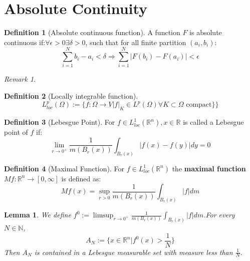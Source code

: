 \documentclass[a4paper,11pt,oneside,fleqn]{book}
\newtheorem{lemma}[theorem]{Lemma}
\theoremstyle{definition}
\newtheorem{definition}{Definition}[section]
\theoremstyle{remark}
\newtheorem*{remark}{Remark}
\begin{document}
\section{Absolute Continuity}
\begin{definition}[Absolute continuous function]
A function $F$ is absolute continuous if:$\forall \epsilon > 0 \exists \delta > 0$, such that for all finite partition $(a_i, b_i)$: 
\begin{equation*}
	\sum_{i = 1}^N b_i - a_i < \delta \Rightarrow \sum_{i = 1}^N |F(b_i) - F(a_i)| < \epsilon
\end{equation*}

\end{definition}
\begin{remark}
\end{remark}

\begin{definition}[Locally integrable function]
	\begin{equation*}
		L^p_{loc}(\Omega) := \{ f: \Omega \rightarrow V | f|_K \in L^p(\Omega) \forall K \subset \Omega \text{ compact} \}   \}
	\end{equation*}
\end{definition}

\begin{definition}[Lebesgue Point]
	For $f \in L_{loc}^1(\mathbb{R}^n), x \in \mathbb{R}$ is called a Lebesgue point of $f$ if:
	\begin{equation*}
		\lim_{r \rightarrow 0^+} \frac{1}{m(B_r(x))} \int_{B_r(x)} |f(x) - f(y)|dy = 0
	\end{equation*}
\end{definition}

\begin{definition}[Maximal Function]
	For $ f \in L^1_{loc}(\mathbb{R}^n)$ the \textbf{maximal function} $Mf: \mathbb{R}^n \rightarrow [0, \infty]$ is defined as:
	\begin{equation*}
		Mf(x) = \sup_{r > 0} \frac{1}{m(B_r(x))} \int_{B_r(x)} |f|dm
	\end{equation*}
\end{definition}

\begin{lemma}
	We define $f^0 := \limsup_{r \rightarrow 0^+} \frac{1}{m(B_r(x))} \int_{B_r(x)} |f|dm$.For every $N \in \mathbb{N}$, 
	\begin{equation*}
		A_N := \{ x \in \mathbb{R}^n | f^0(x) > \frac{1}{N} \}
	\end{equation*}
	Then $A_N$ is contained in a Lebesgue measurable set with measure less than $\frac{1}{N}$.
\end{lemma}
\end{document}
